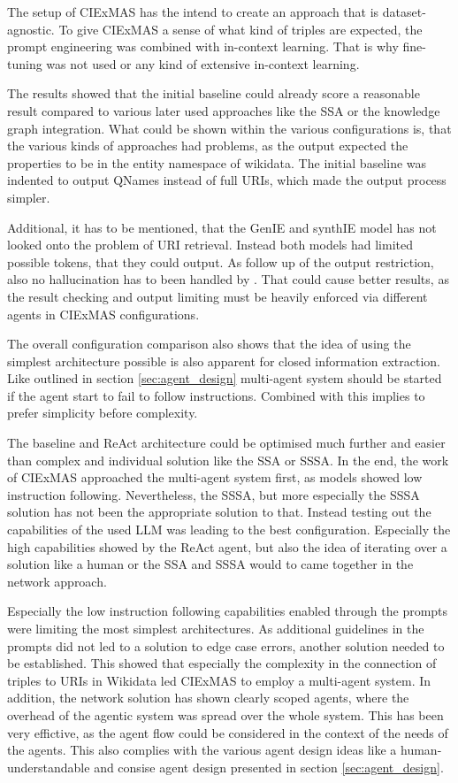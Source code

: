 \documentclass[a4paper,oneside,bibliography=totoc]{scrbook}
\begin{document}
The setup of CIExMAS has the intend to create an approach that is dataset-agnostic. To give CIExMAS a sense of what kind of triples are expected, the prompt engineering was combined with in-context learning. That is why fine-tuning was not used or any kind of extensive in-context learning.

The results showed that the initial baseline could already score a reasonable result compared to various later used approaches like the \ac{SSA} or the knowledge graph integration. What could be shown within the various configurations is, that the various kinds of approaches had problems, as the output expected the properties to be in the entity namespace of wikidata. The initial baseline was indented to output QNames instead of full URIs, which made the output process simpler.

Additional, it has to be mentioned, that the GenIE and synthIE model has not looked onto the problem of URI retrieval. Instead both models had limited possible tokens, that they could output. As follow up of the output restriction, also no hallucination has to been handled by \citet{Josifoski2023}. That could cause better results, as the result checking and output limiting must be heavily enforced via different agents in CIExMAS configurations.

The overall configuration comparison also shows that the idea of using the simplest architecture possible is also apparent for closed information extraction. Like outlined in section \ref{sec:agent_design} multi-agent system should be started if the agent start to fail to follow instructions. Combined with \citet{Anthropic2024} this implies to prefer simplicity before complexity.

The baseline and ReAct architecture could be optimised much further and easier than complex and individual solution like the \ac{SSA} or \ac{SSSA}. In the end, the work of CIExMAS approached the multi-agent system first, as models showed low instruction following. Nevertheless, the \ac{SSSA}, but more especially the \ac{SSSA} solution has not been the appropriate solution to that. Instead testing out the capabilities of the used \ac{LLM} was leading to the best configuration. Especially the high capabilities showed by the ReAct agent, but also the idea of iterating over a solution like a human or the \ac{SSA} and \ac{SSSA} would to came together in the network approach.

Especially the low instruction following capabilities enabled through the prompts were limiting the most simplest architectures. As additional guidelines in the prompts did not led to a solution to edge case errors, another solution needed to be established. This showed that especially the complexity in the connection of triples to URIs in Wikidata led CIExMAS to employ a multi-agent system. In addition, the network solution has shown clearly scoped agents, where the overhead of the agentic system was spread over the whole system. This has been very effictive, as the agent flow could be considered in the context of the needs of the agents. This also complies with the various agent design ideas like a human-understandable and consise agent design presented in section \ref{sec:agent_design}.
\end{document}
